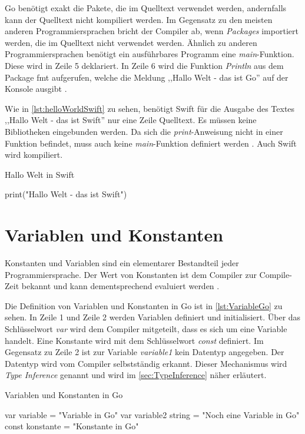 Go benötigt exakt die Pakete, die im Quelltext verwendet werden, andernfalls kann der Quelltext nicht kompiliert werden. 
Im Gegensatz zu den meisten anderen Programmiersprachen bricht der Compiler ab, wenn \emph{Packages} importiert werden, die im Quelltext nicht verwendet werden.
Ähnlich zu anderen Programmiersprachen benötigt ein ausführbares Programm eine \emph{main}-Funktion.
Diese wird in Zeile 5 deklariert.
In Zeile 6 wird die Funktion \emph{Println} aus dem Package fmt aufgerufen, welche die Meldung ,,Hallo Welt - das ist Go'' auf der Konsole ausgibt \cite{Donovan.2016}.


Wie in \autoref{lst:helloWorldSwift} zu sehen, benötigt Swift für die Ausgabe des Textes ,,Hallo Welt - das ist Swift'' nur eine Zeile Quelltext.
Es müssen keine Bibliotheken eingebunden werden. Da sich die \emph{print}-Anweisung nicht in einer Funktion befindet, muss auch keine \emph{main}-Funktion definiert werden \cite{Apple.2017}.
Auch Swift wird kompiliert.

\begin{listing}[H]
\caption{Hallo Welt in Swift}
\label{lst:helloWorldSwift}
\begin{SwiftCode}
print("Hallo Welt - das ist Swift")
\end{SwiftCode}
\end{listing}

\section{Variablen und Konstanten}
Konstanten und Variablen sind ein elementarer Bestandteil jeder Programmiersprache. 
Der Wert von Konstanten ist dem Compiler zur Compile-Zeit bekannt und kann dementsprechend evaluiert werden \cite{Donovan.2016}. 

Die Definition von Variablen und Konstanten in Go ist in \autoref{lst:VariableGo} zu sehen.
In Zeile 1 und Zeile 2 werden Variablen definiert und initialisiert.
Über das Schlüsselwort \emph{var} wird dem Compiler mitgeteilt, dass es sich um eine Variable handelt.
Eine Konstante wird mit dem Schlüsselwort \emph{const} definiert.
Im Gegensatz zu Zeile 2 ist zur Variable \emph{variable1} kein Datentyp angegeben. 
Der Datentyp wird vom Compiler selbstständig erkannt. 
Dieser Mechanismus wird \emph{Type Inference} genannt und wird im \autoref{sec:TypeInference}  näher erläutert.

\begin{listing}[H]
\caption{Variablen und Konstanten in Go}
\label{lst:VariableGo}
\begin{GoCode}
var variable = "Variable in Go"
var variable2 string = "Noch eine Variable in Go"
const konstante = "Konstante in Go"
\end{GoCode}
\end{listing}

